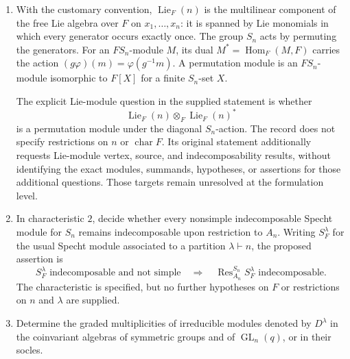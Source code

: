 \documentclass[11pt]{article}
\begin{document}
\begin{enumerate}
In characteristic \(2\), decide whether every nontrivial source of such an irreducible module has even \(F\)-dimension. If ``nontrivial'' means not isomorphic to the one-dimensional trivial \(FP\)-module \(F\), the proposed assertion is
\[
U\not\cong F\quad\Longrightarrow\quad \dim_F U\equiv 0\pmod 2
\]
for every source \(U\) at every vertex \(P\) of every module under consideration. The intended meaning of ``nontrivial'' is not explicitly defined in the record.

\item With the customary convention, \(\operatorname{Lie}_F(n)\) is the multilinear component of the free Lie algebra over \(F\) on \(x_1,\ldots,x_n\): it is spanned by Lie monomials in which every generator occurs exactly once. The group \(S_n\) acts by permuting the generators. For an \(FS_n\)-module \(M\), its dual \(M^*=\operatorname{Hom}_F(M,F)\) carries the action \((g\varphi)(m)=\varphi(g^{-1}m)\). A permutation module is an \(FS_n\)-module isomorphic to \(F[X]\) for a finite \(S_n\)-set \(X\).

The explicit Lie-module question in the supplied statement is whether
\[
\operatorname{Lie}_F(n)\otimes_F\operatorname{Lie}_F(n)^*
\]
is a permutation module under the diagonal \(S_n\)-action. The record does not specify restrictions on \(n\) or \(\operatorname{char}F\). Its original statement additionally requests Lie-module vertex, source, and indecomposability results, without identifying the exact modules, summands, hypotheses, or assertions for those additional questions. Those targets remain unresolved at the formulation level.

\item In characteristic \(2\), decide whether every nonsimple indecomposable Specht module for \(S_n\) remains indecomposable upon restriction to \(A_n\). Writing \(S_F^\lambda\) for the usual Specht module associated to a partition \(\lambda\vdash n\), the proposed assertion is
\[
S_F^\lambda\text{ indecomposable and not simple}
\quad\Longrightarrow\quad
\operatorname{Res}_{A_n}^{S_n}S_F^\lambda\text{ indecomposable}.
\]
The characteristic is specified, but no further hypotheses on \(F\) or restrictions on \(n\) and \(\lambda\) are supplied.

\item Determine the graded multiplicities of irreducible modules denoted by \(D^\lambda\) in the coinvariant algebras of symmetric groups and of \(\operatorname{GL}_n(q)\), or in their socles.


\end{enumerate}
\end{document}
